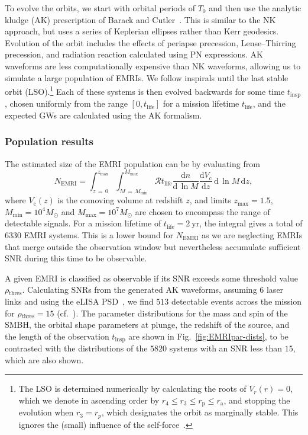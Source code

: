\documentclass[aps,prd,amsfonts,amssymb,amsmath,nofootinbib,showpacs,superscriptaddress,twocolumn,floatfix]{revtex4-1}
\newcommand{\figref}[1]{Fig.~\ref{fig:#1}}
\newcommand{\units}[1]{\ensuremath{~\mathrm{#1}}}
\newcommand{\sub}[1]{\ensuremath{_\mathrm{#1}}}
\newcommand{\dd}{\ensuremath{\mathrm{d}}}
\newcommand{\diff}[2]{\ensuremath{\dfrac{\dd {#1}}{\dd {#2}}}}
\newcommand{\intd}[4]{\ensuremath{\int_{#1}^{#2}{#3}\,\dd{#4}}}
\begin{document}
To evolve the orbits, we start with orbital periods of $T_0$ and then use the analytic kludge (AK) prescription of Barack and Cutler~\cite{Barack2004}. This is similar to the NK approach, but uses a series of Keplerian ellipses rather than Kerr geodesics. Evolution of the orbit includes the effects of periapse precession, Lense--Thirring
precession, and radiation reaction calculated using PN expressions. AK waveforms are less computationally expensive than NK waveforms, allowing us to simulate a large population of EMRIs. We follow inspirals until the last stable orbit (LSO).\footnote{The LSO is determined numerically by calculating the roots of $V_r(r) = 0$, which we denote in ascending order by $r_4 \leq r_3 \leq r\sub{p} \leq r\sub{a}$, and stopping the evolution when $r_3 = r_p$, which designates the orbit as marginally stable. This ignores the (small) influence of the self-force~\cite{Isoyama2014}.} Each of these systems is then evolved backwards for some time $t\sub{insp}$, chosen uniformly from the range $[0,t\sub{life}]$ for a mission lifetime $t\sub{life}$, and the expected GWs are calculated using the AK formalism.

\subsubsection{Population results}

The estimated size of the EMRI population can be by evaluating from~\cite{Gair2009}
\begin{equation}
\label{eq:EMRI-number}
N\sub{EMRI} = \intd{z\,=\,0}{z\sub{max}}{ \intd{M\,=\,M\sub{min}}{M\sub{max}}{\mathcal{R}t\sub{life}\diff{n}{\,\ln M} \diff{V\sub{c}}{z}}{\,\ln M}}{z},
\end{equation}
where $V\sub{c}(z)$ is the comoving volume at redshift $z$, and limits $z\sub{max} = 1.5$, $M\sub{min} = 10^4 M_\odot$ and $M\sub{max} = 10^7 M_\odot$ are chosen to encompass the range of detectable signals. For a mission lifetime of $t\sub{life} = 2\units{yr}$, the integral gives a total of $6330$ EMRI systems. This is a lower bound for $N\sub{EMRI}$ as we are neglecting EMRIs that merge outside the observation window but nevertheless accumulate sufficient SNR during this time to be observable.

A given EMRI is classified as observable if its SNR exceeds some threshold value $\rho\sub{thres}$. Calculating SNRs from the generated AK waveforms, assuming $6$ laser links and using the eLISA PSD~\cite{Amaro-Seoane2012a}, we find $513$ detectable events across the mission for $\rho\sub{thres} = 15$ (cf.\ \cite{Gair2004,Amaro-Seoane2012a,Mapelli2012}). The parameter distributions for the mass and spin of the SMBH, the orbital shape parameters at plunge, the redshift of the source, and the length of the observation $t\sub{insp}$ are shown in \figref{EMRIpar-dists}, to be contrasted with the distributions of the $5820$ systems with an SNR less than $15$, which are also shown.%
\end{document}
